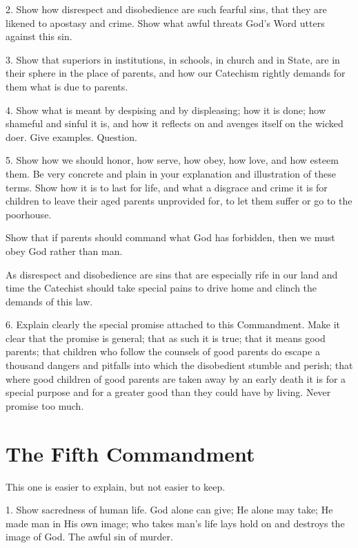 2. Show how disrespect and disobedience are such fearful sins, that they are likened to apostasy and crime. Show what awful threats God’s Word utters against this sin.

 3. Show that superiors in institutions, in schools, in church and in State, are in their sphere in the place of parents, and how our Catechism rightly demands for them what is due to parents.

4. Show what is meant by despising and by displeasing; how it is done; how shameful and sinful it is, and how it reflects on and avenges itself on the wicked doer. Give examples. Question.

 5. Show how we should honor, how serve, how obey, how love, and how esteem them. Be very concrete and plain in your explanation and illustration of these terms. Show how it is to last for life, and what a disgrace and crime it is for children to leave their aged parents unprovided for, to let them suffer or go to the poorhouse.

Show that if parents should command what God has forbidden, then we must obey God rather than man.

As disrespect and disobedience are sins that are especially rife in our land and time the Catechist should take special pains to drive home and clinch the demands of this law.

 6. Explain clearly the special promise attached to this Commandment. Make it clear that the promise is general; that as such it is true; that it means good parents; that children who follow the counsels of good parents do escape a thousand dangers and pitfalls into which the disobedient stumble and perish; that where good children of good parents are taken away by an early death it is for a special purpose and for a greater good than they could have by living. Never promise too much.

\section{The Fifth Commandment}

This one is easier to explain, but not easier to keep.

 1. Show sacredness of human life. God alone can give; He alone may take; He made man in His own image; who takes man’s life lays hold on and destroys the image of God. The awful sin of murder.

